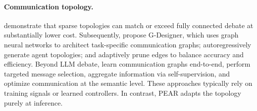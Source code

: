 \paragraph{Communication topology.}
\citet{li2024improving} demonstrate that sparse topologies can match or exceed fully connected debate at substantially lower cost. %
Subsequently, %
\citet{zhang2024g:g-designer} propose G-Designer, which uses graph neural networks to architect task-specific communication graphs; \citet{shen2025assemble} autoregressively generate agent topologies; and \citet{li2025adaptive} adaptively prune edges to balance accuracy and efficiency. Beyond LLM debate, \citet{hu2024learning} learn communication graphs end-to-end, \citet{sun2024t2mac} perform targeted message selection, \citet{guan2024efficient} aggregate information via self-supervision, and \citet{10720863} optimize communication at the semantic level. 
These approaches typically %
rely on training signals or learned controllers. In contrast, PEAR adapts the topology purely at inference.  %
